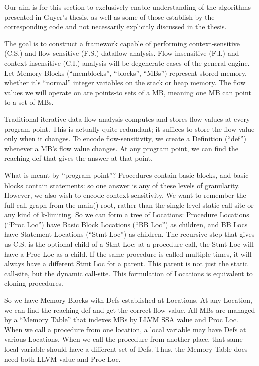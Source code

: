 Our aim is for this section to exclusively enable understanding of the
algorithms presented in Guyer's thesis, as well as some of those establish by
the corresponding code and not necessarily explicitly discussed in the thesis.

The goal is to construct a framework capable of performing context-sensitive
(C.S.) and flow-sensitive (F.S.) dataflow analysis. Flow-insensitive (F.I.) and
context-insensitive (C.I.) analysis will be degenerate cases of the general
engine. Let Memory Blocks (``memblocks'', ``blocks'', ``MBs'') represent stored
memory, whether it's ``normal'' integer variables on the stack or heap memory.
The flow values we will operate on are points-to sets of a MB, meaning one MB
can point to a set of MBs.

Traditional iterative data-flow analysis computes and stores flow values at
every program point. This is actually quite redundant; it suffices to store the
flow value only when it changes. To encode flow-sensitivity, we create a
Definition (``def'') whenever a MB's flow value changes. At any program point, we
can find the reaching def that gives the answer at that point.

What is meant by ``program point''? Procedures contain basic blocks, and basic
blocks contain statements: so one answer is any of these levels of granularity.
However, we also wish to encode context-sensitivity. We want to remember the
full call graph from the main() root, rather than the single-level static
call-site or any kind of k-limiting. So we can form a tree of Locations:
Procedure Locations (``Proc Loc'') have Basic Block Locations (``BB Loc'') as
children, and BB Locs have Statement Locations (``Stmt Loc'') as children. The
recursive step that gives us C.S. is the optional child of a Stmt Loc: at a
procedure call, the Stmt Loc will have a Proc Loc as a child. If the same
procedure is called multiple times, it will always have a different Stmt Loc for
a parent. This parent is not just the static call-site, but the
dynamic call-site. This formulation of Locations is equivalent to cloning
procedures.

So we have Memory Blocks with Defs established at Locations. At any Location, we
can find the reaching def and get the correct flow value. All MBs are managed by
a ``Memory Table'' that indexes MBs by LLVM SSA value and Proc Loc. When we call a
procedure from one location, a local variable may have Defs at various
Locations. When we call the procedure from another place, that same local
variable should have a different set of Defs. Thus, the Memory Table does need
both LLVM value and Proc Loc.

